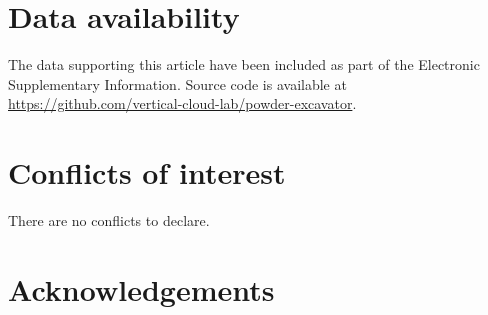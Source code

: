\documentclass[8.5pt,twoside,twocolumn]{article}
\begin{document}
\section*{Data availability}
The data supporting this article have been included as part of the
Electronic Supplementary Information. Source code is available at
\url{https://github.com/vertical-cloud-lab/powder-excavator}.

\section*{Conflicts of interest}
There are no conflicts to declare.

\section*{Acknowledgements}
\lipsum[8][1-2]

\balance

\renewcommand\refname{Notes and references}

\footnotesize{


}
\end{document}
